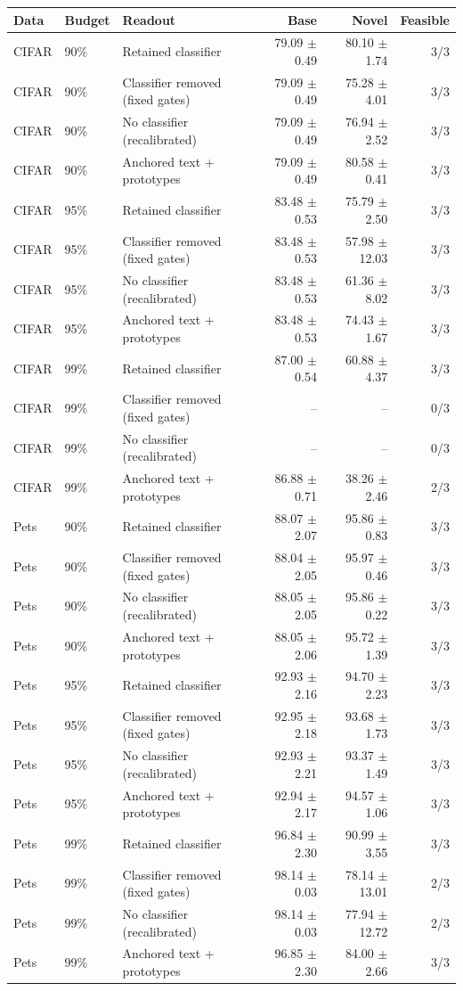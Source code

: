 \begin{tabular}{lllrrr}
\toprule
Data & Budget & Readout & Base & Novel & Feasible \\
\midrule
CIFAR & 90\% & Retained classifier & 79.09 $\pm$ 0.49 & 80.10 $\pm$ 1.74 & 3/3 \\
CIFAR & 90\% & Classifier removed (fixed gates) & 79.09 $\pm$ 0.49 & 75.28 $\pm$ 4.01 & 3/3 \\
CIFAR & 90\% & No classifier (recalibrated) & 79.09 $\pm$ 0.49 & 76.94 $\pm$ 2.52 & 3/3 \\
CIFAR & 90\% & Anchored text + prototypes & 79.09 $\pm$ 0.49 & 80.58 $\pm$ 0.41 & 3/3 \\
CIFAR & 95\% & Retained classifier & 83.48 $\pm$ 0.53 & 75.79 $\pm$ 2.50 & 3/3 \\
CIFAR & 95\% & Classifier removed (fixed gates) & 83.48 $\pm$ 0.53 & 57.98 $\pm$ 12.03 & 3/3 \\
CIFAR & 95\% & No classifier (recalibrated) & 83.48 $\pm$ 0.53 & 61.36 $\pm$ 8.02 & 3/3 \\
CIFAR & 95\% & Anchored text + prototypes & 83.48 $\pm$ 0.53 & 74.43 $\pm$ 1.67 & 3/3 \\
CIFAR & 99\% & Retained classifier & 87.00 $\pm$ 0.54 & 60.88 $\pm$ 4.37 & 3/3 \\
CIFAR & 99\% & Classifier removed (fixed gates) & -- & -- & 0/3 \\
CIFAR & 99\% & No classifier (recalibrated) & -- & -- & 0/3 \\
CIFAR & 99\% & Anchored text + prototypes & 86.88 $\pm$ 0.71 & 38.26 $\pm$ 2.46 & 2/3 \\
Pets & 90\% & Retained classifier & 88.07 $\pm$ 2.07 & 95.86 $\pm$ 0.83 & 3/3 \\
Pets & 90\% & Classifier removed (fixed gates) & 88.04 $\pm$ 2.05 & 95.97 $\pm$ 0.46 & 3/3 \\
Pets & 90\% & No classifier (recalibrated) & 88.05 $\pm$ 2.05 & 95.86 $\pm$ 0.22 & 3/3 \\
Pets & 90\% & Anchored text + prototypes & 88.05 $\pm$ 2.06 & 95.72 $\pm$ 1.39 & 3/3 \\
Pets & 95\% & Retained classifier & 92.93 $\pm$ 2.16 & 94.70 $\pm$ 2.23 & 3/3 \\
Pets & 95\% & Classifier removed (fixed gates) & 92.95 $\pm$ 2.18 & 93.68 $\pm$ 1.73 & 3/3 \\
Pets & 95\% & No classifier (recalibrated) & 92.93 $\pm$ 2.21 & 93.37 $\pm$ 1.49 & 3/3 \\
Pets & 95\% & Anchored text + prototypes & 92.94 $\pm$ 2.17 & 94.57 $\pm$ 1.06 & 3/3 \\
Pets & 99\% & Retained classifier & 96.84 $\pm$ 2.30 & 90.99 $\pm$ 3.55 & 3/3 \\
Pets & 99\% & Classifier removed (fixed gates) & 98.14 $\pm$ 0.03 & 78.14 $\pm$ 13.01 & 2/3 \\
Pets & 99\% & No classifier (recalibrated) & 98.14 $\pm$ 0.03 & 77.94 $\pm$ 12.72 & 2/3 \\
Pets & 99\% & Anchored text + prototypes & 96.85 $\pm$ 2.30 & 84.00 $\pm$ 2.66 & 3/3 \\
\bottomrule
\end{tabular}
